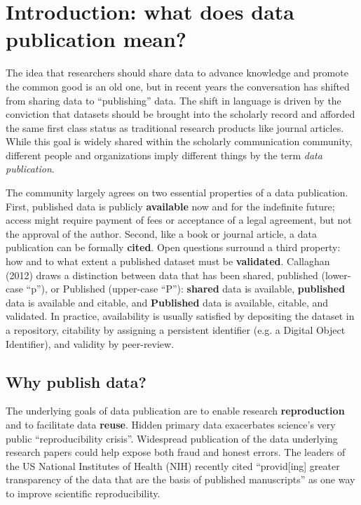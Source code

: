 \documentclass[10pt,twocolumn]{article}
\begin{document}
\section*{Introduction: what does data publication mean?}\label{introduction}

The idea that researchers should share data to advance knowledge and promote the common good is an old one, but in recent years the conversation has shifted from sharing data to ``publishing'' data.\cite{costello_motivating_2009,smith_data_2009,lawrence_data_2011}
The shift in language is driven by the conviction that datasets should be brought into the scholarly record and afforded the same first class status as traditional research products like journal articles.\cite{sarah_callaghan_making_2012}
While this goal is widely shared within the scholarly communication community, different people and organizations imply different things by the term \emph{data publication}.

The community largely agrees on two essential properties of a data publication.\cite{smith_data_2009,sarah_callaghan_making_2012}
First, published data is publicly \textbf{available} now and for the indefinite future; access might require payment of fees or acceptance of a legal agreement, but not the approval of the author.
Second, like a book or journal article, a data publication can be formally \textbf{cited}.
Open questions surround a third property: how and to what extent a published dataset must be \textbf{validated}.
Callaghan (2012)\cite{sarah_callaghan_making_2012} draws a distinction between data that has been shared, published (lower-case “p”), or Published (upper-case “P”): \textbf{shared} data is available, \textbf{published} data is available and citable, and \textbf{Published} data is available, citable, and validated.
In practice, availability is usually satisfied by depositing the dataset in a repository, citability by assigning a persistent identifier (e.g. a Digital Object Identifier), and validity by peer-review.

\subsection*{Why publish data?}\label{why-publish-data}

The underlying goals of data publication are to enable research \textbf{reproduction} and to facilitate data \textbf{reuse}.
Hidden primary data exacerbates science's very public ``reproducibility crisis''.\cite{mobley_survey_2013,pashler_is_2012,zimmer_rise_2012,hiltzik_science_2013,begley_drug_2012}
Widespread publication of the data underlying research papers could help expose both fraud and honest errors.\cite{drew_lost_2013}
The leaders of the US National Institutes of Health (NIH) recently cited ``provid[ing] greater transparency of the data that are the basis of published manuscripts'' as one way to improve scientific reproducibility.\cite{collins_nih_2014}
\end{document}
